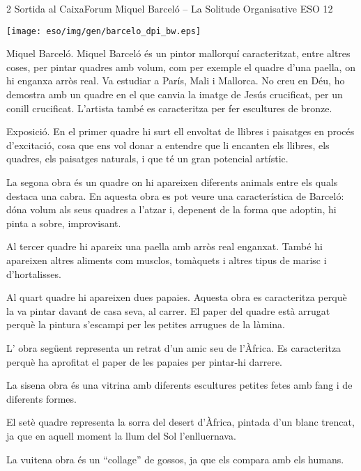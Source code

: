 %
%
\begin{news}
{2} %
{Sortida al CaixaForum}
{Miquel Barceló – La Solitude Organisative}
{ESO}
{12} %

\noindent\texttt{[image: eso/img/gen/barcelo\_dpi\_bw.eps]}


Miquel Barceló.
Miquel Barceló és un pintor mallorquí caracteritzat, entre altres coses, per pintar quadres amb volum, com per exemple el quadre d'una paella, on hi enganxa arròs real. Va estudiar a París, Mali i Mallorca. No creu en Déu, ho demostra amb un quadre en el que canvia la imatge de Jesús crucificat, per un conill crucificat. L’artista també es caracteritza per fer escultures de bronze.

Exposició.
En el primer quadre hi surt ell envoltat de llibres i paisatges en procés d'excitació, cosa que ens vol donar a entendre que li encanten els llibres, els quadres, els paisatges naturals, i que té un gran potencial artístic.

La segona obra és un quadre on hi apareixen diferents animals entre els quals destaca una cabra. En aquesta obra es pot veure una característica de Barceló: dóna volum als seus quadres a l’atzar i, depenent de la forma que adoptin, hi pinta a sobre, improvisant.

Al tercer quadre hi apareix una paella amb arròs real enganxat. També hi apareixen altres aliments com musclos, tomàquets i altres tipus de marisc i d’hortalisses. 

Al quart quadre hi apareixen dues papaies. Aquesta obra es caracteritza perquè la va pintar davant de casa seva, al carrer. El paper del quadre està arrugat perquè la pintura s’escampi per les petites arrugues de la làmina.

L’ obra següent representa un retrat d’un amic seu de l’Àfrica. Es caracteritza perquè ha aprofitat el paper de les papaies per pintar-hi darrere.
 
La sisena obra és una vitrina amb diferents escultures petites fetes amb fang i de diferents formes.

El setè quadre representa la sorra del desert d’Àfrica, pintada d’un blanc trencat, ja que en aquell moment la llum del Sol l’enlluernava.

La vuitena obra és un “collage” de gossos, ja que els compara amb els humans.


\end{news}
